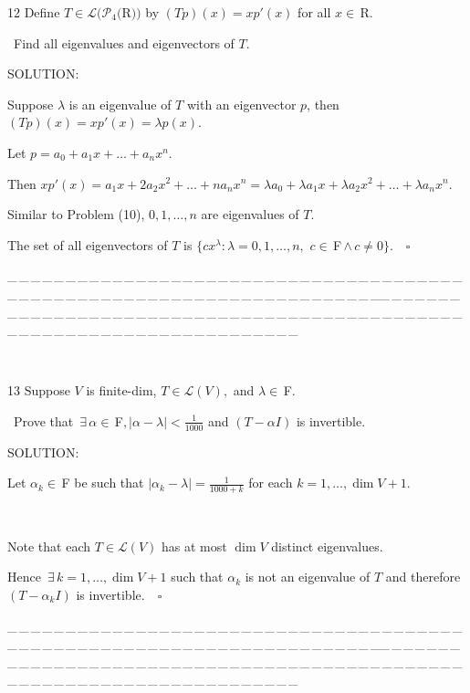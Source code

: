 \documentclass[a4paper, 11pt, UTF8]{article}
\def\Lm{\mathcal{L}}
\def\Po{\mathcal{P}}
\def\Fbf{$\,{\timesbf F}\,$}
\def\Fbfc{$\,{\timesbf F}$}
\def\Rbfc{$\,{\timesbf R}$}
\begin{document}
\begin{large}
{\timesbf\Large 12} {\timessl\Large 
Define $T\in\Lm(\Po_4(${\timesbf R}$))$ by $(Tp)(x) = xp'(x)$ for all $x\in\Rbfc.$}\par\quad\,
{\timessl\Large Find all eigenvalues and eigenvectors of $T$.}\par
{\timesbf S\footnotesize{OLUTION:}}\par\quad
Suppose $\lambda$ is an eigenvalue of $T$ with an eigenvector $p$, then $(Tp)(x)=xp'(x)=\lambda p(x).$\par\quad
Let $p=a_0+a_1 x+\dots+a_n x^n.$\par\quad
Then $xp'(x)=a_1 x+2a_2 x^2+\dots+n a_n x^n=\lambda a_0+\lambda a_1 x+\lambda a_2 x^2+\dots+\lambda a_n x^n.$\par\quad
Similar to Problem (10), $0,1,\dots,n$ are eigenvalues of $T.$\par\quad
The set of all eigenvectors of $T$ is $\{cx^\lambda:\lambda=0,1,\dots,n,\,\,c\in\Fbf\wedge\,c\neq 0\}.\quad\square$\par
{\tiny \_\,\_\,\_\,\_\,\_\,\_\,\_\,\_\,\_\,\_\,\_\,\_\,\_\,\_\,\_\,\_\,\_\,\_\,\_\,\_\,\_\,\_\,\_\,\_\,\_\,\_\,\_\,\_\,\_\,\_\,\_\,\_\,\_\,\_\,\_\,\_\,\_\,\_\,\_\,\_\,\_\,\_\,\_\,\_\,\_\,\_\,\_\,\_\,\_\,\_\,\_\,\_\,\_\,\_\,\_\,\_\,\_\,\_\,\_\,\_\,\_\,\_\,\_\,\_\,\_\,\_\,\_\,\_\,\_\,\_\,\_\_\,\_\,\_\,\_\,\_\,\_\,\_\,\_\,\_\,\_\,\_\,\_\,\_\,\_\,\_\,\_\,\_\,\_\,\_\,\_\,\_\,\_\,\_\,\_\,\_\,\_\,\_\,\_\,\_\,\_\,\_\,\_\,\_\,\_\,\_\,\_\,\_\,\_\,\_\,\_\,\_\,\_\,\_\,\_\,\_\,\_\,\_\,\_\,\_\,\_\,\_\,\_\,\_\,\_\,\_\,\_\,\_\,\_\,\_\,\_\,\_\,\_\,\_\,\_\,\_\,\_\,\_\,\_\,\_\,\_\,\_}\par{\tiny\,\par}

{\timesbf\Large 13} {\timessl\Large 
Suppose $V$ is finite-dim, $T\in\Lm(V),$ and $\lambda\in\Fbfc.$}\par\quad\,
{\timessl\Large Prove that $\,\exists\,\alpha\in\Fbfc,|\alpha-\lambda|<\frac{1}{1000}$ and $(T-\alpha I)$ is invertible.}\par
{\timesbf S\footnotesize{OLUTION:}}\par\quad
Let $\alpha_k\in\Fbf\,$be such that $|\alpha_k-\lambda|=\displaystyle\frac{1}{1000+k}$ for each $k=1,\dots,\dim V+1.$\par{\tiny\,\par}\quad
Note that each $T\in\Lm(V)$ has at most $\dim V$ distinct eigenvalues.\par\quad
Hence $\,\exists\,k=1,\dots,\dim V+1$ such that $\alpha_k$ is not an eigenvalue of $T$ and therefore $(T-\alpha_k I)$ is invertible.$\quad\square$\par
{\tiny \_\,\_\,\_\,\_\,\_\,\_\,\_\,\_\,\_\,\_\,\_\,\_\,\_\,\_\,\_\,\_\,\_\,\_\,\_\,\_\,\_\,\_\,\_\,\_\,\_\,\_\,\_\,\_\,\_\,\_\,\_\,\_\,\_\,\_\,\_\,\_\,\_\,\_\,\_\,\_\,\_\,\_\,\_\,\_\,\_\,\_\,\_\,\_\,\_\,\_\,\_\,\_\,\_\,\_\,\_\,\_\,\_\,\_\,\_\,\_\,\_\,\_\,\_\,\_\,\_\,\_\,\_\,\_\,\_\,\_\,\_\_\,\_\,\_\,\_\,\_\,\_\,\_\,\_\,\_\,\_\,\_\,\_\,\_\,\_\,\_\,\_\,\_\,\_\,\_\,\_\,\_\,\_\,\_\,\_\,\_\,\_\,\_\,\_\,\_\,\_\,\_\,\_\,\_\,\_\,\_\,\_\,\_\,\_\,\_\,\_\,\_\,\_\,\_\,\_\,\_\,\_\,\_\,\_\,\_\,\_\,\_\,\_\,\_\,\_\,\_\,\_\,\_\,\_\,\_\,\_\,\_\,\_\,\_\,\_\,\_\,\_\,\_\,\_\,\_\,\_\,\_}\par


\end{large}
\end{document}
